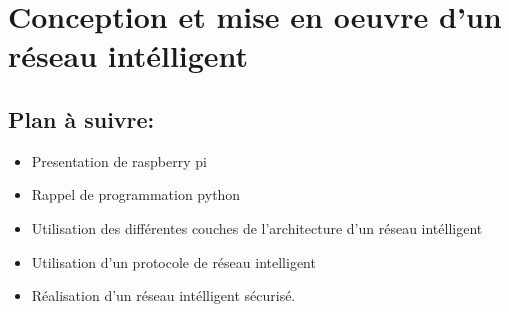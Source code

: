 \documentclass[12pt]{report}
\begin{document}
\chapter{Conception et mise en oeuvre d'un réseau intélligent}

\section*{Plan à suivre:}
\begin{itemize}
      \item{Presentation de raspberry pi}
      \item{Rappel de programmation python}
      \item{Utilisation des différentes couches de l'architecture d'un réseau intélligent}
      \item{Utilisation d'un protocole de réseau intelligent}
      \item{Réalisation d'un réseau intélligent sécurisé.}
\end{itemize}
\end{document}
